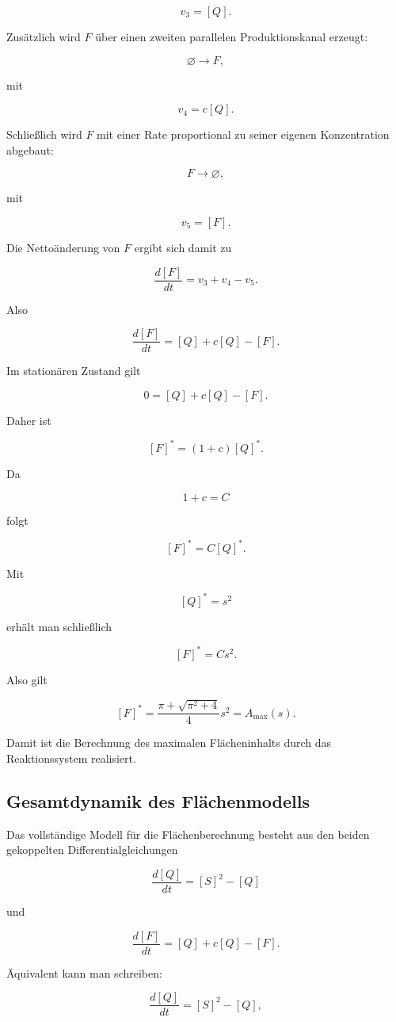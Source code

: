 \[
v_3=[Q].
\]

Zusätzlich wird \(F\) über einen zweiten parallelen Produktionskanal
erzeugt:

\[
\varnothing \longrightarrow F,
\]

mit

\[
v_4=c[Q].
\]

Schließlich wird \(F\) mit einer Rate proportional zu seiner eigenen
Konzentration abgebaut:

\[
F\longrightarrow\varnothing,
\]

mit

\[
v_5=[F].
\]

Die Nettoänderung von \(F\) ergibt sich damit zu

\[
\frac{d[F]}{dt}
=
v_3+v_4-v_5.
\]

Also

\[
\frac{d[F]}{dt}
=
[Q]+c[Q]-[F].
\]

Im stationären Zustand gilt

\[
0=[Q]+c[Q]-[F].
\]

Daher ist

\[
[F]^*=(1+c)[Q]^*.
\]

Da

\[
1+c=C
\]

folgt

\[
[F]^*=C[Q]^*.
\]

Mit

\[
[Q]^*=s^2
\]

erhält man schließlich

\[
[F]^*=Cs^2.
\]

Also gilt

\[
[F]^*
=
\frac{\pi+\sqrt{\pi^2+4}}{4}s^2
=
A_{\max}(s).
\]

Damit ist die Berechnung des maximalen Flächeninhalts durch das
Reaktionssystem realisiert.

\subsection{Gesamtdynamik des Flächenmodells}

Das vollständige Modell für die Flächenberechnung besteht aus den beiden
gekoppelten Differentialgleichungen

\[
\frac{d[Q]}{dt}
=
[S]^2-[Q]
\]

und

\[
\frac{d[F]}{dt}
=
[Q]+c[Q]-[F].
\]

Äquivalent kann man schreiben:

\[
\frac{d[Q]}{dt}
=
[S]^2-[Q],
\]

